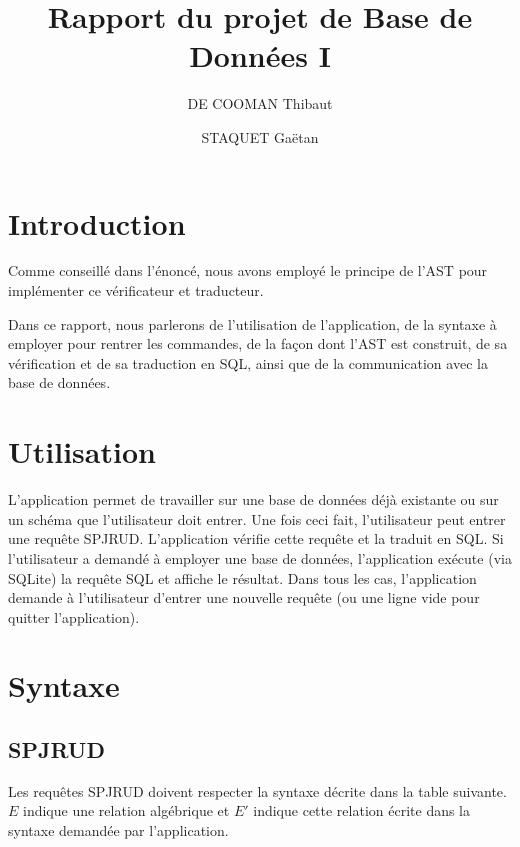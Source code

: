 \documentclass[]{article}
\title{Rapport du projet de Base de Donn\'ees I}
\author{DE COOMAN Thibaut \and STAQUET Ga\"etan}
\begin{document}
\maketitle

\tableofcontents

\section{Introduction}
Comme conseill\'e dans l'\'enonc\'e, nous avons employ\'e le principe de l'AST pour impl\'ementer ce v\'erificateur et traducteur.

Dans ce rapport, nous parlerons de l'utilisation de l'application, de la syntaxe \`a employer pour rentrer les commandes, de la fa\c{c}on dont l'AST est construit, de sa v\'erification et de sa traduction en SQL, ainsi que de la communication avec la base de donn\'ees.

\section{Utilisation}
L'application permet de travailler sur une base de donn\'ees d\'ej\`a existante ou sur un sch\'ema que l'utilisateur doit entrer. Une fois ceci fait, l'utilisateur peut entrer une requ\^ete SPJRUD. L'application v\'erifie cette requ\^ete et la traduit en SQL. Si l'utilisateur a demand\'e \`a employer une base de donn\'ees, l'application ex\'ecute (via SQLite) la requ\^ete SQL et affiche le r\'esultat. Dans tous les cas, l'application demande \`a l'utilisateur d'entrer une nouvelle requ\^ete (ou une ligne vide pour quitter l'application).

\section{Syntaxe}
\subsection{SPJRUD}
Les requ\^etes SPJRUD doivent respecter la syntaxe d\'ecrite dans la table suivante. $E$ indique une relation alg\'ebrique et $E'$ indique cette relation \'ecrite dans la syntaxe demand\'ee par l'application.
\end{document}
